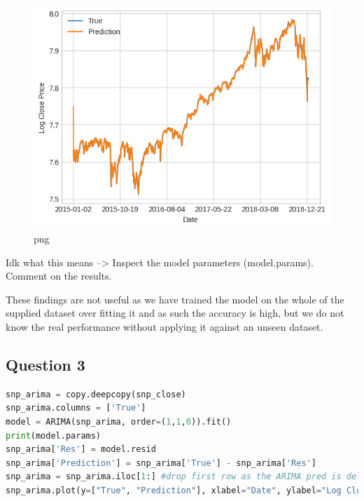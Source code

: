 \begin{figure}
\centering
\includegraphics{ARMAvsARIMA_files/ARMAvsARIMA_6_3.png}
\caption{png}
\end{figure}

Idk what this means --\textgreater{} Inspect the model parameters
(model.params). Comment on the results.

These findings are not useful as we have trained the model on the whole
of the supplied dataset over fitting it and as such the accuracy is
high, but we do not know the real performance without applying it
against an unseen dataset.

\hypertarget{question-3}{%
\subsection{Question 3}\label{question-3}}

\begin{lstlisting}[language=Python]
snp_arima = copy.deepcopy(snp_close)
snp_arima.columns = ['True']
model = ARIMA(snp_arima, order=(1,1,0)).fit()
print(model.params)
snp_arima['Res'] = model.resid
snp_arima['Prediction'] = snp_arima['True'] - snp_arima['Res']
snp_arima = snp_arima.iloc[1:] #drop first row as the ARIMA pred is delay by 1 and fails on first iter i think
snp_arima.plot(y=["True", "Prediction"], xlabel="Date", ylabel="Log Close Price")
\end{lstlisting}

